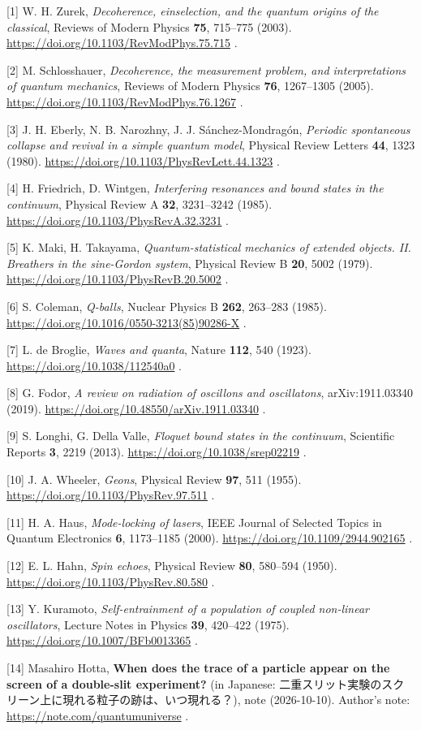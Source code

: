 \documentclass[
  a4paper,
]{article}
\begin{document}
{[}1{]} W. H. Zurek, \emph{Decoherence, einselection, and the quantum
origins of the classical}, Reviews of Modern Physics \textbf{75},
715--775 (2003). \url{https://doi.org/10.1103/RevModPhys.75.715} .

{[}2{]} M. Schlosshauer, \emph{Decoherence, the measurement problem, and
interpretations of quantum mechanics}, Reviews of Modern Physics
\textbf{76}, 1267--1305 (2005).
\url{https://doi.org/10.1103/RevModPhys.76.1267} .

{[}3{]} J. H. Eberly, N. B. Narozhny, J. J. Sánchez-Mondragón,
\emph{Periodic spontaneous collapse and revival in a simple quantum
model}, Physical Review Letters \textbf{44}, 1323 (1980).
\url{https://doi.org/10.1103/PhysRevLett.44.1323} .

{[}4{]} H. Friedrich, D. Wintgen, \emph{Interfering resonances and bound
states in the continuum}, Physical Review A \textbf{32}, 3231--3242
(1985). \url{https://doi.org/10.1103/PhysRevA.32.3231} .

{[}5{]} K. Maki, H. Takayama, \emph{Quantum-statistical mechanics of
extended objects. II. Breathers in the sine-Gordon system}, Physical
Review B \textbf{20}, 5002 (1979).
\url{https://doi.org/10.1103/PhysRevB.20.5002} .

{[}6{]} S. Coleman, \emph{Q-balls}, Nuclear Physics B \textbf{262},
263--283 (1985). \url{https://doi.org/10.1016/0550-3213(85)90286-X} .

{[}7{]} L. de Broglie, \emph{Waves and quanta}, Nature \textbf{112}, 540
(1923). \url{https://doi.org/10.1038/112540a0} .

{[}8{]} G. Fodor, \emph{A review on radiation of oscillons and
oscillatons}, arXiv:1911.03340 (2019).
\url{https://doi.org/10.48550/arXiv.1911.03340} .

{[}9{]} S. Longhi, G. Della Valle, \emph{Floquet bound states in the
continuum}, Scientific Reports \textbf{3}, 2219 (2013).
\url{https://doi.org/10.1038/srep02219} .

{[}10{]} J. A. Wheeler, \emph{Geons}, Physical Review \textbf{97}, 511
(1955). \url{https://doi.org/10.1103/PhysRev.97.511} .

{[}11{]} H. A. Haus, \emph{Mode-locking of lasers}, IEEE Journal of
Selected Topics in Quantum Electronics \textbf{6}, 1173--1185 (2000).
\url{https://doi.org/10.1109/2944.902165} .

{[}12{]} E. L. Hahn, \emph{Spin echoes}, Physical Review \textbf{80},
580--594 (1950). \url{https://doi.org/10.1103/PhysRev.80.580} .

{[}13{]} Y. Kuramoto, \emph{Self-entrainment of a population of coupled
non-linear oscillators}, Lecture Notes in Physics \textbf{39}, 420--422
(1975). \url{https://doi.org/10.1007/BFb0013365} .

{[}14{]} Masahiro Hotta, \textbf{When does the trace of a particle
appear on the screen of a double-slit experiment?} (in Japanese:
二重スリット実験のスクリーン上に現れる粒子の跡は、いつ現れる？), note
(2026-10-10). Author's note: \url{https://note.com/quantumuniverse} .
\end{document}
